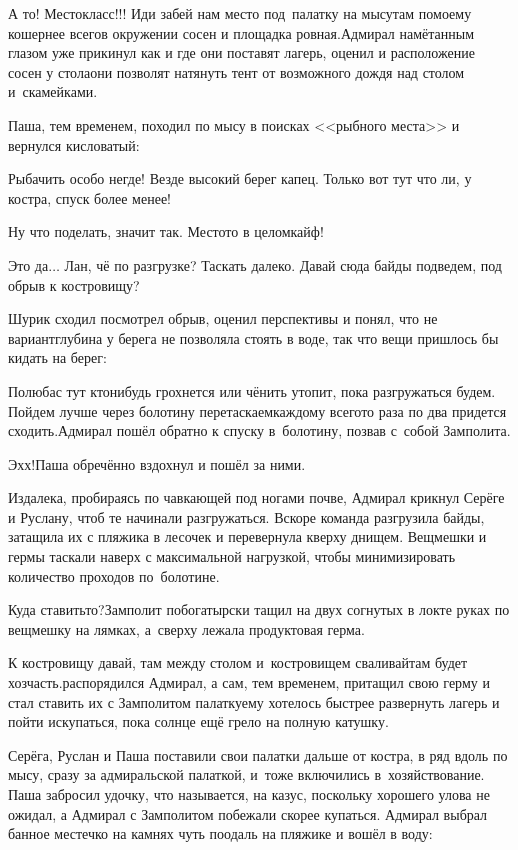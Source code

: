 \diagdash А то! Место\mdash класс!!! Иди забей нам место под~палатку на мысу\mdash там по\sdash моему кошернее всего\mdash в окружении сосен и площадка ровная.\mdash Адмирал намётанным глазом уже прикинул как и где они поставят лагерь, оценил и расположение сосен у стола\mdash они позволят натянуть тент от возможного дождя над столом и~скамейками. 

Паша, тем временем, походил по мысу в поисках <<рыбного места>> и вернулся кисловатый:

\diagdash Рыбачить особо негде! Везде высокий берег капец. Только вот тут что ли, у костра, спуск более менее!

\diagdash Ну что поделать, значит так. Место\sdash то в целом\mdash кайф!

\diagdash Это да$\ldots$ Лан, чё по разгрузке? Таскать далеко. Давай сюда байды подведем, под обрыв к костровищу? 

Шурик сходил посмотрел обрыв, оценил перспективы и понял, что не вариант\mdash глубина у берега не позволяла стоять в воде, так что вещи пришлось бы кидать на берег:

\diagdash Полюбас тут кто\sdash нибудь грохнется или чё\sdash нить утопит, пока разгружаться будем. Пойдем лучше через болотину перетаскаем\mdash каждому всего\sdash то раза по два придется сходить.\mdash Адмирал пошёл обратно к спуску в~болотину, позвав с~собой Замполита.

\diagdash Эх\sdash х!\mdash Паша обречённо вздохнул и пошёл за ними.

Издалека, пробираясь по чавкающей под ногами почве, Адмирал крикнул Серёге и Руслану, чтоб те начинали разгружаться. Вскоре команда разгрузила байды, затащила их с пляжика в лесочек и перевернула кверху днищем. Вещмешки и гермы таскали наверх с максимальной нагрузкой, чтобы минимизировать количество проходов по~болотине. 

\diagdash Куда ставить\sdash то?\mdash Замполит по\sdash богатырски тащил на двух согнутых в локте руках по вещмешку на лямках, а~сверху лежала продуктовая герма.

\diagdash К костровищу давай, там между столом и~костровищем сваливай\mdash там будет хозчасть.\mdash распорядился Адмирал, а сам, тем временем, притащил свою герму и стал ставить их с Замполитом палатку\mdash ему хотелось быстрее развернуть лагерь и пойти искупаться, пока солнце ещё грело на полную катушку.

Серёга, Руслан и Паша поставили свои палатки дальше от костра, в ряд вдоль по мысу, сразу за адмиральской палаткой, и~тоже включились в~хозяйствование. Паша забросил удочку, что называется, на казус, поскольку хорошего улова не ожидал, а Адмирал с Замполитом побежали скорее купаться. Адмирал выбрал банное местечко на камнях чуть поодаль на пляжике и вошёл в воду: 

